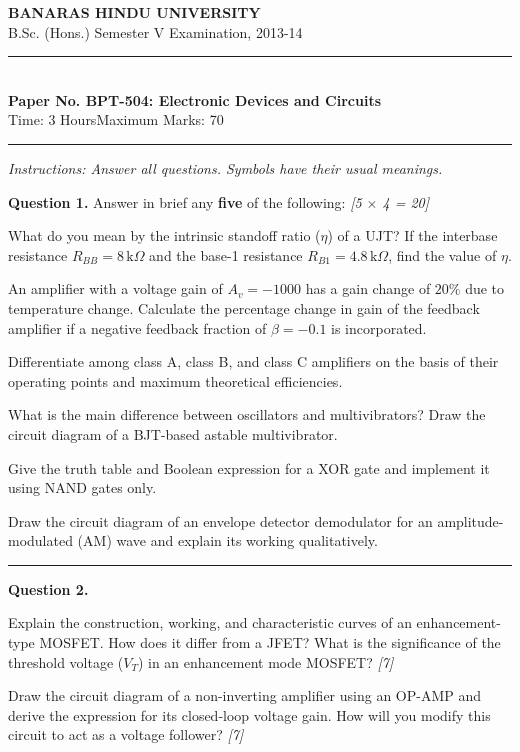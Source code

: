 \documentclass[11pt,a4paper]{article}
\newcommand{\pts}[1]{\hfill   \textit{[#1]}}
\begin{document}
\begin{center}
  {\large\bfseries BANARAS HINDU UNIVERSITY}\\[2pt]
  {\normalsize B.Sc. (Hons.) Semester V Examination, 2013-14}\\[6pt]
  \rule{0.8\linewidth}{0.5pt}\\[6pt]
  {\large\bfseries Paper No. BPT-504: Electronic Devices and Circuits}\\[4pt]
  {\normalsize Time: 3 Hours\hfill Maximum Marks: 70}
\end{center}
\rule{\linewidth}{0.4pt}
\smallskip



\noindent   \textit{Instructions: Answer all questions. Symbols have their usual meanings.}
\bigskip




\noindent   \textbf{Question 1.} Answer in brief any   \textbf{five} of the following: \pts{5 $ \times$ 4 = 20}

\begin{parts}
  \item What do you mean by the intrinsic standoff ratio ($\eta$) of a UJT? If the interbase resistance $R_{BB} = 8\, \text{k}\Omega$ and the base-1 resistance $R_{B1} = 4.8\, \text{k}\Omega$, find the value of $\eta$.
  \item An amplifier with a voltage gain of $A_v = -1000$ has a gain change of $20\%$ due to temperature change. Calculate the percentage change in gain of the feedback amplifier if a negative feedback fraction of $\beta = -0.1$ is incorporated.
  \item Differentiate among class A, class B, and class C amplifiers on the basis of their operating points and maximum theoretical efficiencies.
  \item What is the main difference between oscillators and multivibrators? Draw the circuit diagram of a BJT-based astable multivibrator.
  \item Give the truth table and Boolean expression for a XOR gate and implement it using NAND gates only.
  \item Draw the circuit diagram of an envelope detector demodulator for an amplitude-modulated (AM) wave and explain its working qualitatively.
\end{parts}

\medskip\rule{\linewidth}{0.2pt}




\noindent   \textbf{Question 2.}

\begin{parts}
  \item Explain the construction, working, and characteristic curves of an enhancement-type MOSFET. How does it differ from a JFET? What is the significance of the threshold voltage ($V_T$) in an enhancement mode MOSFET? \pts{7}
  \item Draw the circuit diagram of a non-inverting amplifier using an OP-AMP and derive the expression for its closed-loop voltage gain. How will you modify this circuit to act as a voltage follower? \pts{7}
\end{parts}
\end{document}
